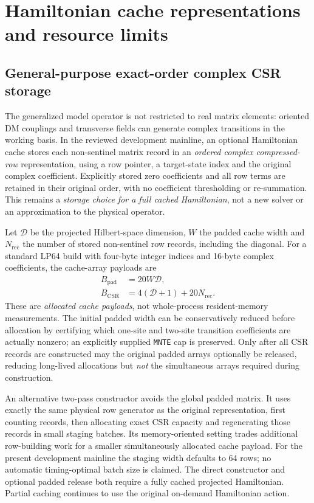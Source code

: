\documentclass[preprint,12pt,nopreprintline]{elsarticle}
\begin{document}
\section{Hamiltonian cache representations and resource limits}
\subsection{General-purpose exact-order complex CSR storage}
The generalized model operator is not restricted to real matrix
elements: oriented DM couplings and transverse fields can generate
complex transitions in the working basis. In the reviewed development
mainline, an optional Hamiltonian cache stores each non-sentinel
matrix record in an \emph{ordered complex compressed-row}
representation, using a row pointer, a target-state index and the
original complex coefficient. Explicitly stored zero coefficients
and all row terms are retained in their original order, with no
coefficient thresholding or re-summation. This remains a
\emph{storage choice for a full cached Hamiltonian}, not a new
solver or an approximation to the physical operator.

Let $\mathcal D$ be the projected Hilbert-space dimension,
$W$ the padded cache width and $N_{\mathrm{rec}}$ the number
of stored non-sentinel row records, including the diagonal.
For a standard LP64 build with four-byte integer indices and
16-byte complex coefficients, the cache-array payloads are
\begin{align}
B_{\mathrm{pad}} &= 20 W\mathcal D, \nonumber\\
B_{\mathrm{CSR}} &= 4(\mathcal D+1)+20N_{\mathrm{rec}}.
\label{eq:general-csr-size}
\end{align}
These are \emph{allocated cache payloads}, not whole-process
resident-memory measurements. The initial padded width can be
conservatively reduced before allocation by certifying which
one-site and two-site transition coefficients are actually
nonzero; an explicitly supplied \texttt{MNTE} cap is preserved.
Only after all CSR records are constructed may the original padded
arrays optionally be released, reducing long-lived allocations
but \emph{not} the simultaneous arrays required during construction.

An alternative two-pass constructor avoids the global padded
matrix. It uses exactly the same physical row generator as the
original representation, first counting records, then allocating
exact CSR capacity and regenerating those records in small staging
batches. Its memory-oriented setting trades additional row-building
work for a smaller simultaneously allocated cache payload.
For the present development mainline the staging width defaults
to 64 rows; no automatic timing-optimal batch size is claimed.
The direct constructor and optional padded release both
require a fully cached projected Hamiltonian. Partial caching
continues to use the original on-demand Hamiltonian action.
\end{document}
